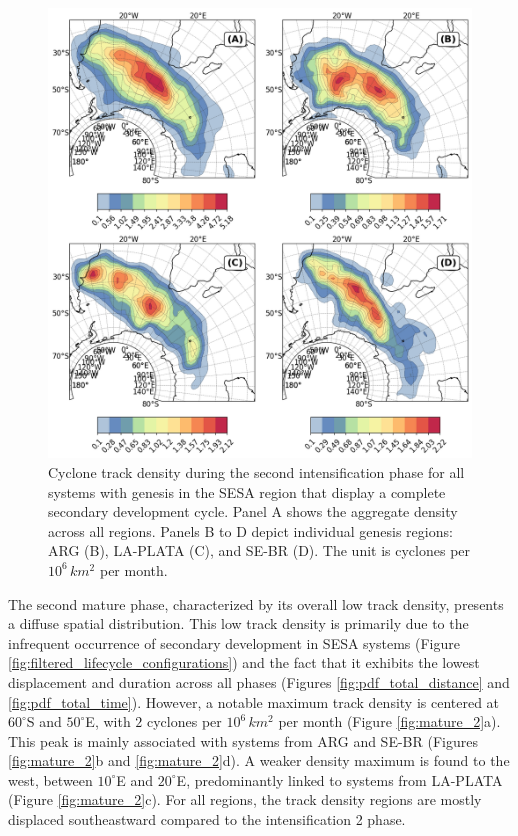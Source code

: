 \begin{figure}[!htbp]
\centering
\includegraphics[width=\textwidth]{figs_4/density_map_intensification 2_regions_secondary.png}
\caption[Track Density - Intensification 2]{Cyclone track density during the second intensification phase for all systems with genesis in the SESA region that display a complete secondary development cycle. Panel A shows the aggregate density across all regions. Panels B to D depict individual genesis regions: ARG (B), LA-PLATA (C), and SE-BR (D). The unit is cyclones per \(10^6 \, km^2\) per month.}
\label{fig:intensification_2}
\end{figure}

The second mature phase, characterized by its overall low track density, presents a diffuse spatial distribution. This low track density is primarily due to the infrequent occurrence of secondary development in SESA systems (Figure \ref{fig:filtered_lifecycle_configurations}) and the fact that it exhibits the lowest displacement and duration across all phases (Figures \ref{fig:pdf_total_distance} and \ref{fig:pdf_total_time}). However, a notable maximum track density is centered at \(60^\circ\)S and \(50^\circ\)E, with \(2\) cyclones per \(10^6 \, km^2\) per month (Figure \ref{fig:mature_2}a). This peak is mainly associated with systems from ARG and SE-BR (Figures \ref{fig:mature_2}b and \ref{fig:mature_2}d). A weaker density maximum is found to the west, between \(10^\circ\)E and \(20^\circ\)E, predominantly linked to systems from LA-PLATA (Figure \ref{fig:mature_2}c). For all regions, the track density regions are mostly displaced southeastward compared to the intensification 2 phase.


